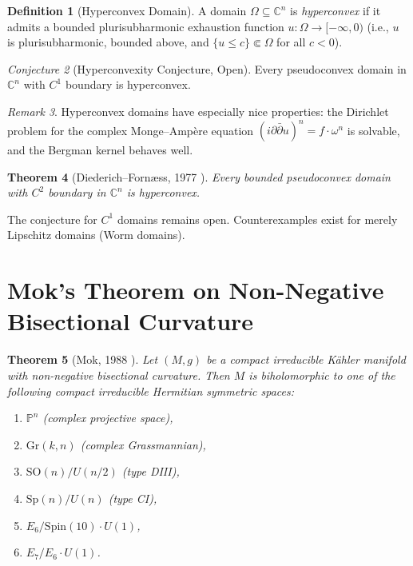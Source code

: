 \documentclass[12pt,a4paper]{amsart}
\newtheorem{theorem}{Theorem}[section]
\theoremstyle{definition}
\newtheorem{definition}[theorem]{Definition}
\theoremstyle{remark}
\newtheorem{remark}[theorem]{Remark}
\newtheorem{conjecture}[theorem]{Conjecture}
\newcommand{\CC}{\mathbb{C}}
\newcommand{\PP}{\mathbb{P}}
\begin{document}
\begin{definition}[Hyperconvex Domain]
A domain $\Omega \subseteq \CC^n$ is \emph{hyperconvex} if it admits a
bounded plurisubharmonic exhaustion function $u \colon \Omega \to [-\infty, 0)$
(i.e., $u$ is plurisubharmonic, bounded above, and $\{u \le c\} \Subset \Omega$
for all $c < 0$).
\end{definition}

\begin{conjecture}[Hyperconvexity Conjecture, Open]
\label{conj:hyperconvex}
Every pseudoconvex domain in $\CC^n$ with $C^1$ boundary is hyperconvex.
\end{conjecture}

\begin{remark}
Hyperconvex domains have especially nice properties: the Dirichlet problem
for the complex Monge--Ampère equation
$(i\partial\bar\partial u)^n = f \cdot \omega^n$
is solvable, and the Bergman kernel behaves well.
\end{remark}

\begin{theorem}[Diederich--Fornæss, 1977 \cite{DiederichFornaess1977}]
Every bounded pseudoconvex domain with $C^2$ boundary in $\CC^n$ is hyperconvex.
\end{theorem}

The conjecture for $C^1$ domains remains open.  Counterexamples exist for
merely Lipschitz domains (Worm domains).

\section{Mok's Theorem on Non-Negative Bisectional Curvature}

\begin{theorem}[Mok, 1988 \cite{Mok1988}]
\label{thm:mok}
Let $(M, g)$ be a compact irreducible Kähler manifold with non-negative
bisectional curvature.  Then $M$ is biholomorphic to one of the following
\emph{compact irreducible Hermitian symmetric spaces}:
\begin{enumerate}[label=(\roman*)]
  \item $\PP^n$ (complex projective space),
  \item $\mathrm{Gr}(k,n)$ (complex Grassmannian),
  \item $\mathrm{SO}(n)/U(n/2)$ (type DIII),
  \item $\mathrm{Sp}(n)/U(n)$ (type CI),
  \item $E_6/\mathrm{Spin}(10)\cdot U(1)$,
  \item $E_7/E_6 \cdot U(1)$.
\end{enumerate}
\end{theorem}
\end{document}
